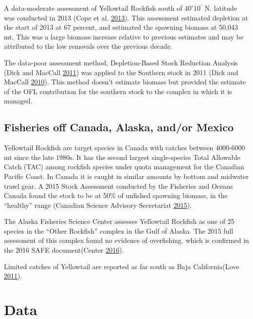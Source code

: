 \documentclass[12pt,]{article}
\begin{document}
A data-moderate assessment of Yellowtail Rockfish south of
\(40^\circ 10^\prime\) N. latitude was conducted in 2013 (Cope et al.
\protect\hyperlink{ref-Cope2013}{2013}). This assessment estimated
depletion at the start of 2013 at 67 percent, and estimated the spawning
biomass at 50,043 mt. This was a large biomass increase relative to
previous estimates and may be attributed to the low removals over the
previous decade.

The data-poor assessment method, Depletion-Based Stock Reduction
Analysis (Dick and MacCall \protect\hyperlink{ref-Dick2011}{2011}) was
applied to the Southern stock in 2011 (Dick and MacCall
\protect\hyperlink{ref-Dick2010}{2010}). This method doesn't estimate
biomass but provided the estimate of the OFL contribution for the
southern stock to the complex in which it is managed.

\subsection{Fisheries off Canada, Alaska, and/or
Mexico}\label{fisheries-off-canada-alaska-andor-mexico}

Yellowtail Rockfish are target species in Canada with catches between
4000-6000 mt since the late 1980s. It has the second largest
single-species Total Allowable Catch (TAC) among rockfish species under
quota management for the Canadian Pacific Coast. In Canada it is caught
in similar amounts by bottom and midwater trawl gear. A 2015 Stock
Assessment conducted by the Fisheries and Oceans Canada found the stock
to be at 50\% of unfished spawning biomass, in the ``healthy'' range
(Canadian Science Advisory Secretariat
\protect\hyperlink{ref-DFO2015}{2015}).

The Alaska Fisheries Science Center assesses Yellowtail Rockfish as one
of 25 species in the ``Other Rockfish'' complex in the Gulf of Alaska.
The 2015 full assessment of this complex found no evidence of
overfishing, which is confirmed in the 2016 SAFE document(Center
\protect\hyperlink{ref-AFSC2016}{2016}).

Limited catches of Yellowtail are reported as far south as Baja
California(Love \protect\hyperlink{ref-Love2011}{2011}).

\newpage

\captionsetup[table]{labelformat=empty,justification=raggedright,font=bf, singlelinecheck=false}

\section{Data}\label{data}
\end{document}
